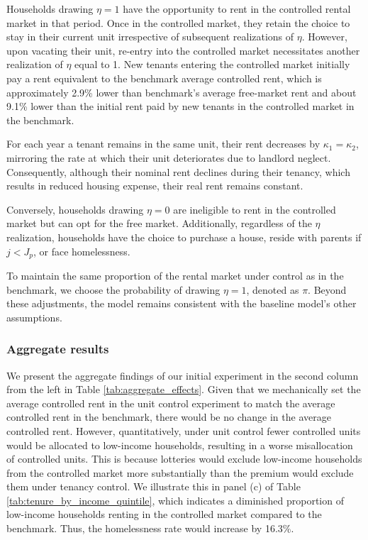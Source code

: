 \documentclass[parskip=full]{article}
\begin{document}
Households drawing $\eta = 1$ have the opportunity to rent in the controlled rental market in that period. Once in the controlled market, they retain the choice to stay in their current unit irrespective of subsequent realizations of $\eta$. However, upon vacating their unit, re-entry into the controlled market necessitates another realization of $\eta$ equal to 1. New tenants entering the controlled market initially pay a rent equivalent to the benchmark average controlled rent, which is approximately 2.9\% lower than benchmark's average free-market rent and about 9.1\% lower than the initial rent paid by new tenants in the controlled market in the benchmark.

For each year a tenant remains in the same unit, their rent decreases by $\kappa_{1}=\kappa_{2}$, mirroring the rate at which their unit deteriorates due to landlord neglect. Consequently, although their nominal rent declines during their tenancy, which results in reduced housing expense, their real rent remains constant.

Conversely, households drawing $\eta = 0$ are ineligible to rent in the controlled market but can opt for the free market. Additionally, regardless of the $\eta$ realization, households have the choice to purchase a house, reside with parents if $j<J_{p}$, or face homelessness.

To maintain the same proportion of the rental market under control as in the benchmark, we choose the probability of drawing $\eta = 1$, denoted as $\pi$. Beyond these adjustments, the model remains consistent with the baseline model's other assumptions.

\subsubsection{Aggregate results}

We present the aggregate findings of our initial experiment in the second column from the left in Table \ref{tab:aggregate_effects}. Given that we mechanically set the average controlled rent in the unit control experiment to match the average controlled rent in the benchmark, there would be no change in the average controlled rent. However, quantitatively, under unit control fewer controlled units would be allocated to low-income households, resulting in a worse misallocation of controlled units. This is because lotteries would exclude low-income households from the controlled market more substantially than the premium would exclude them under tenancy control. We illustrate this in panel (c) of Table \ref{tab:tenure_by_income_quintile}, which indicates a diminished proportion of low-income households renting in the controlled market compared to the benchmark. Thus, the homelessness rate would increase by 16.3\%.
\end{document}

